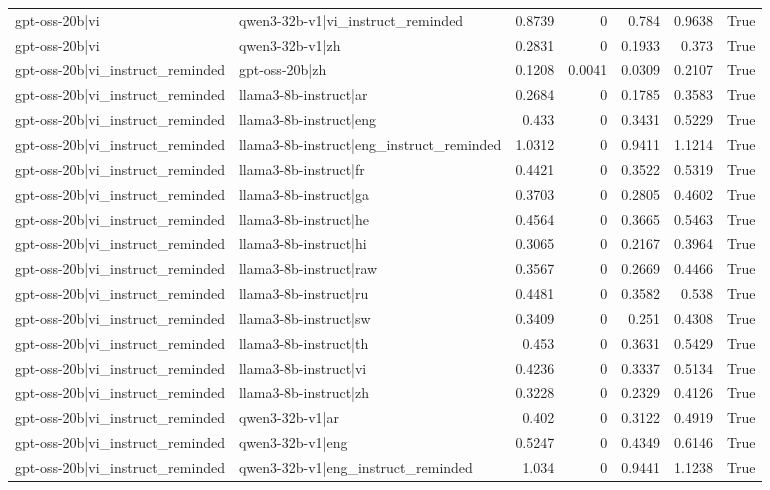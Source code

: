 \begin{table}
\begin{tabular}{l l r r r r l}
gpt-oss-20b|vi & qwen3-32b-v1|vi_instruct_reminded & 0.8739 & 0 & 0.784 & 0.9638 & True \\
gpt-oss-20b|vi & qwen3-32b-v1|zh & 0.2831 & 0 & 0.1933 & 0.373 & True \\
gpt-oss-20b|vi_instruct_reminded & gpt-oss-20b|zh & 0.1208 & 0.0041 & 0.0309 & 0.2107 & True \\
gpt-oss-20b|vi_instruct_reminded & llama3-8b-instruct|ar & 0.2684 & 0 & 0.1785 & 0.3583 & True \\
gpt-oss-20b|vi_instruct_reminded & llama3-8b-instruct|eng & 0.433 & 0 & 0.3431 & 0.5229 & True \\
gpt-oss-20b|vi_instruct_reminded & llama3-8b-instruct|eng_instruct_reminded & 1.0312 & 0 & 0.9411 & 1.1214 & True \\
gpt-oss-20b|vi_instruct_reminded & llama3-8b-instruct|fr & 0.4421 & 0 & 0.3522 & 0.5319 & True \\
gpt-oss-20b|vi_instruct_reminded & llama3-8b-instruct|ga & 0.3703 & 0 & 0.2805 & 0.4602 & True \\
gpt-oss-20b|vi_instruct_reminded & llama3-8b-instruct|he & 0.4564 & 0 & 0.3665 & 0.5463 & True \\
gpt-oss-20b|vi_instruct_reminded & llama3-8b-instruct|hi & 0.3065 & 0 & 0.2167 & 0.3964 & True \\
gpt-oss-20b|vi_instruct_reminded & llama3-8b-instruct|raw & 0.3567 & 0 & 0.2669 & 0.4466 & True \\
gpt-oss-20b|vi_instruct_reminded & llama3-8b-instruct|ru & 0.4481 & 0 & 0.3582 & 0.538 & True \\
gpt-oss-20b|vi_instruct_reminded & llama3-8b-instruct|sw & 0.3409 & 0 & 0.251 & 0.4308 & True \\
gpt-oss-20b|vi_instruct_reminded & llama3-8b-instruct|th & 0.453 & 0 & 0.3631 & 0.5429 & True \\
gpt-oss-20b|vi_instruct_reminded & llama3-8b-instruct|vi & 0.4236 & 0 & 0.3337 & 0.5134 & True \\
gpt-oss-20b|vi_instruct_reminded & llama3-8b-instruct|zh & 0.3228 & 0 & 0.2329 & 0.4126 & True \\
gpt-oss-20b|vi_instruct_reminded & qwen3-32b-v1|ar & 0.402 & 0 & 0.3122 & 0.4919 & True \\
gpt-oss-20b|vi_instruct_reminded & qwen3-32b-v1|eng & 0.5247 & 0 & 0.4349 & 0.6146 & True \\
gpt-oss-20b|vi_instruct_reminded & qwen3-32b-v1|eng_instruct_reminded & 1.034 & 0 & 0.9441 & 1.1238 & True \\

\end{tabular}
\end{table}
